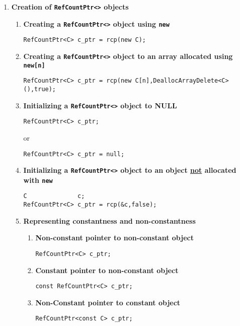 \documentclass[pdf,ps2pdf,11pt]{SANDreport}
\begin{document}
\begin{enumerate}

\item {\bf Creation of \texttt{RefCountPtr<>} objects}

\begin{enumerate}

\item {\bf Creating a \texttt{RefCountPtr<>} object using \texttt{new}}
\label{rcpqs:apdx:qs:new}
%
 {\small\begin{verbatim}
RefCountPtr<C> c_ptr = rcp(new C);
\end{verbatim}}
%
\item {\bf Creating a \texttt{RefCountPtr<>} object to an array allocated using \texttt{new[n]}}
\label{rcpqs:apdx:qs:array-new}
%
 {\small\begin{verbatim}
RefCountPtr<C> c_ptr = rcp(new C[n],DeallocArrayDelete<C>(),true);
\end{verbatim}}
%
\item {\bf Initializing a \texttt{RefCountPtr<>} object to NULL}
\label{rcpqs:apdx:qs:null}
%
{\small\begin{verbatim}
RefCountPtr<C> c_ptr;
\end{verbatim}}
or
{\small\begin{verbatim}
RefCountPtr<C> c_ptr = null;
\end{verbatim}}
%
\item {\bf Initializing a \texttt{RefCountPtr<>} object to an object
       \underline{not} allocated with \texttt{new}}
\label{rcpqs:apdx:qs:not-new}
%
{\small\begin{verbatim}
C              c;
RefCountPtr<C> c_ptr = rcp(&c,false);
\end{verbatim}}
%
%
\item {\bf Representing constantness and non-constantness}
%
\begin{enumerate}
%
\item {\bf Non-constant pointer to non-constant object }
{\small\begin{verbatim}
RefCountPtr<C> c_ptr;
\end{verbatim}}
%
\item {\bf Constant pointer to non-constant object }
{\small\begin{verbatim}
const RefCountPtr<C> c_ptr;
\end{verbatim}}
%
\item {\bf Non-Constant pointer to constant object }
{\small\begin{verbatim}
RefCountPtr<const C> c_ptr;

\end{verbatim}}
\end{enumerate}
\end{enumerate}
\end{enumerate}
\end{document}
